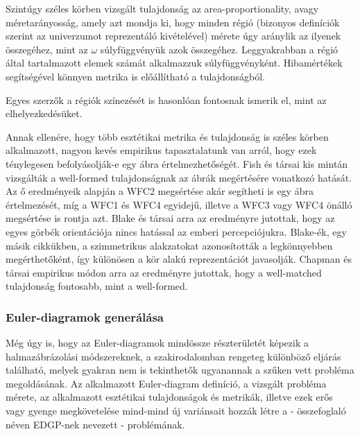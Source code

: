 Szintúgy széles körben vizsgált tulajdonság az area-proportionality, avagy méretarányosság\cite{euler_with_circles, area_proportional_phd, drawing_area_proportional, general_area_proportional}, amely azt mondja ki, hogy minden régió (bizonyos definíciók szerint az univerzumot reprezentáló kivételével) mérete úgy aránylik az ilyenek összegéhez, mint az $\omega$ súlyfüggvényük azok összegéhez. Leggyakrabban a régió által tartalmazott elemek számát alkalmazzuk súlyfüggvényként. Hibamértékek segítségével könnyen metrika is előállítható a tulajdonságból.


Egyes szerzők a régiók színezését is hasonlóan fontosnak ismerik el, mint az elhelyezkedésüket\cite{imdb_euler, how_color_euler}.


Annak ellenére, hogy több esztétikai metrika és tulajdonság is széles körben alkalmazott, nagyon kevés empirikus tapasztalatunk van arról, hogy ezek ténylegesen befolyásolják-e egy ábra értelmezhetőségét. Fish és társai kis mintán vizsgálták\cite{euler_comprehension} a well-formed tulajdonságnak az ábrák megértésére vonatkozó hatását. Az ő eredményeik alapján a WFC2 megsértése akár segítheti is egy ábra értelmezését, míg a WFC1 és WFC4 egyidejű, illetve a WFC3 vagy WFC4 önálló megsértése is rontja azt. Blake és társai\cite{orientation_comprehension} arra az eredményre jutottak, hogy az egyes görbék orientációja nincs hatással az emberi percepciójukra. Blake-ék, egy másik cikkükben\cite{shape_comprehension}, a szimmetrikus alakzatokat azonosították a legkönnyebben megérthetőként, így különösen a kör alakú reprezentációt javasolják. Chapman és társai empirikus módon arra az eredményre jutottak\cite{wellmatched_important}, hogy a well-matched tulajdonság fontosabb, mint a well-formed.

\subsubsection{Euler-diagramok generálása}

Még úgy is, hogy az Euler-diagramok mindössze részterületét képezik a halmazábrázolási módszereknek, a szakirodalomban rengeteg különböző eljárás található, melyek gyakran nem is tekinthetők ugyanannak a szűken vett probléma megoldásának. Az alkalmazott Euler-diagram definíció, a vizsgált probléma mérete, az alkalmazott esztétikai tulajdonságok és metrikák, illetve ezek erős vagy gyenge megkövetelése mind-mind új variánsait hozzák létre a - összefoglaló néven EDGP-nek nevezett - problémának.

